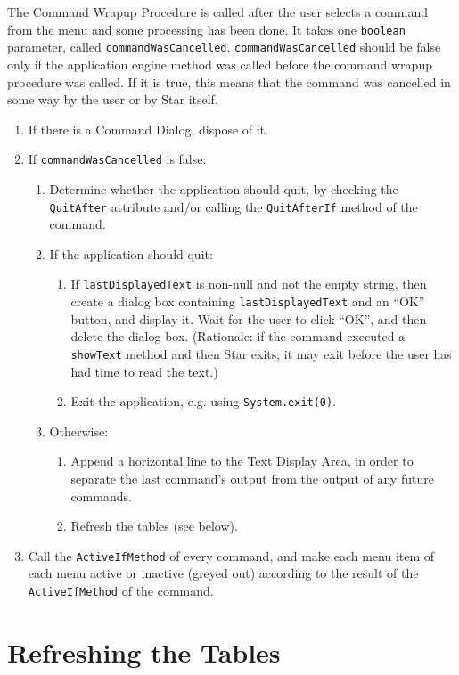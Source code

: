 \documentclass[11pt]{article}
\begin{document}
The Command Wrapup Procedure is called after the user selects a
command from the menu and some processing has been done.  It takes
one {\tt boolean} parameter,
called {\tt commandWasCancelled}.  {\tt commandWasCancelled}
should be false only if the application engine method was called before
the command wrapup procedure was called.  If it is true, this means that
the command was cancelled in some way by the user or by Star itself.
\begin{enumerate}
\item If there is a Command Dialog, dispose of it.
\item If {\tt commandWasCancelled} is false:
  \begin{enumerate}
  \item Determine whether the application should quit, by checking
    the {\tt QuitAfter} attribute and/or calling the {\tt QuitAfterIf}
    method of the command.
  \item If the application should quit:
    \begin{enumerate}
    \item If {\tt lastDisplayedText} is non-null and not the empty string,
      then create a dialog box containing {\tt lastDisplayedText} and
      an ``OK'' button, and display it.  Wait for the user to
      click ``OK'', and then delete the dialog box.
      (Rationale:  if the command executed a {\tt showText} method and
      then Star exits, it may exit before the user has had time to
      read the text.)
    \item Exit the application, e.g. using {\tt System.exit(0)}.
    \end{enumerate}
  \item Otherwise:
    \begin{enumerate}
    \item Append a horizontal line to the Text Display Area, in order to
      separate the last command's output from the output of any
      future commands.
    \item Refresh the tables (see below).
    \end{enumerate}
  \end{enumerate}
\item Call the {\tt ActiveIfMethod} of every command, and make each
  menu item of each menu active or inactive (greyed out) according to
  the result of the {\tt ActiveIfMethod} of the command.
\end{enumerate}

\section{Refreshing the Tables}
\end{document}
